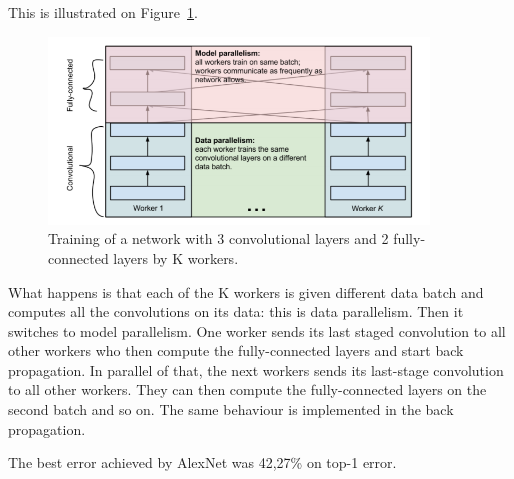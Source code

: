 This is illustrated on Figure~\ref{fig:alexnet}. 
\begin{figure}[!htp]
    \centering
        \includegraphics[width=0.9\textwidth]{./figures/02-alexnet}
        \caption{Training of a network with 3 convolutional layers and 2 fully-connected layers by K workers. }\label{fig:alexnet}
\end{figure}
What happens is that each of the K workers is given different data batch and computes all the convolutions on its data: this is data parallelism. Then it switches to model parallelism. One worker sends its last staged convolution to all other workers who then compute the fully-connected layers and start back propagation. In parallel of that, the next workers sends its last-stage convolution to all other workers. They can then compute the fully-connected layers on the second batch and so on. The same behaviour is implemented in the back propagation. 

The best error achieved by AlexNet was 42,27\% on top-1 error. 

